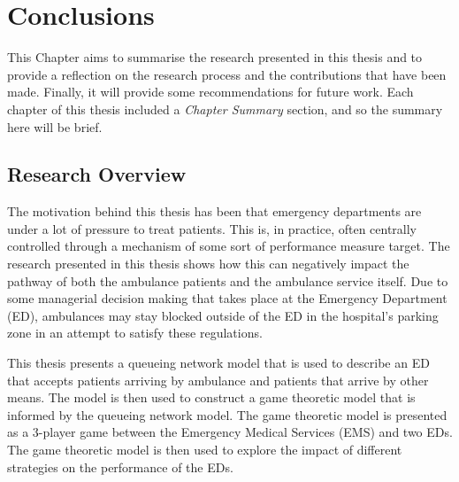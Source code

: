 \chapter{Conclusions}\label{sec:conclusion}

This Chapter aims to summarise the research presented in this thesis and to
provide a reflection on the research process and the
contributions that have been made.
Finally, it will provide some recommendations for future work.
Each chapter of this thesis included a \textit{Chapter Summary} section, and
so the summary here will be brief.


\section{Research Overview}

The motivation behind this thesis has been that emergency departments
are under a lot of pressure to treat patients.
This is, in practice, often centrally controlled through a mechanism of some
sort of performance measure target.
The research presented in this thesis shows how this can negatively impact the
pathway of both the ambulance patients and the ambulance service itself.
Due to some managerial decision making that takes place at the Emergency
Department (ED), ambulances may
stay blocked outside of the ED in the hospital's parking zone in an attempt to
satisfy these regulations.

This thesis presents a queueing network model that is used to describe an
ED that accepts patients arriving by ambulance and
patients that arrive by other means.
The model is then used to construct a game theoretic model that is informed
by the queueing network model.
The game theoretic model is presented as a 3-player game between the
Emergency Medical Services (EMS) and two EDs.
The game theoretic model is then used to explore the impact of different
strategies on the performance of the EDs.


